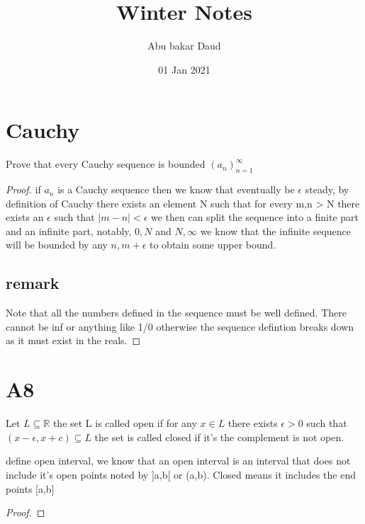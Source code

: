 \documentclass[10pt, a4paper]{article}
\title{Winter Notes}
\author{Abu bakar Daud }
\date{01 Jan 2021 }
\begin{document}
\maketitle 

\section{Cauchy}

Prove that every Cauchy sequence is bounded $(a_n)^{\infty}_{n=1}  $
\begin{proof}


if $a_n$ is a Cauchy sequence then we know that eventually be $\epsilon$ steady, by definition of Cauchy there exists an element N such that for every m,n > N there exists an $\epsilon$ such that
$|m-n| < \epsilon$ we then can split the sequence into a finite part and an infinite part, notably, ${0,N}$ and ${N,\infty}$ 
we know that the infinite sequence will be bounded by any $n,m + \epsilon$ to obtain some upper bound. 


\subsection*{remark}
Note that all the numbers defined in the sequence must be well defined. There cannot be inf or anything like 1/0 otherwise the sequence defintion breaks down as it must exist in the reals. 



\end{proof}




\section*{A8}

Let $L \subseteq \mathbb{R}  $ the set L is called open if for any $x \in L$ there exists $\epsilon > 0$ such that $(x - \epsilon, x + c   ) \subseteq L$ the set is called closed if it's the complement is not open.   


define open interval, we know that an open interval is an interval that does not include it's open points noted by ]a,b[ or (a,b). Closed means it includes the end points [a,b] 



\begin{proof}
	
\end{proof}
\end{document}
